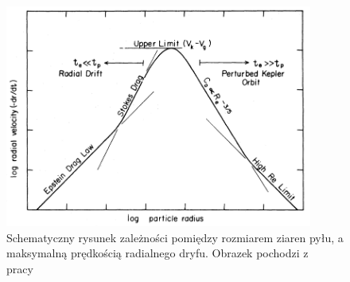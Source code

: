 \begin{figure}
   \includegraphics[width=0.9\textwidth]{figures/chap1_drift.png}
   \caption{Schematyczny rysunek zależności pomiędzy rozmiarem ziaren pyłu, a
   maksymalną prędkością radialnego dryfu. Obrazek pochodzi z
   pracy~\cite{W77}}
   \label{fig:chap1_drift}
\end{figure}

